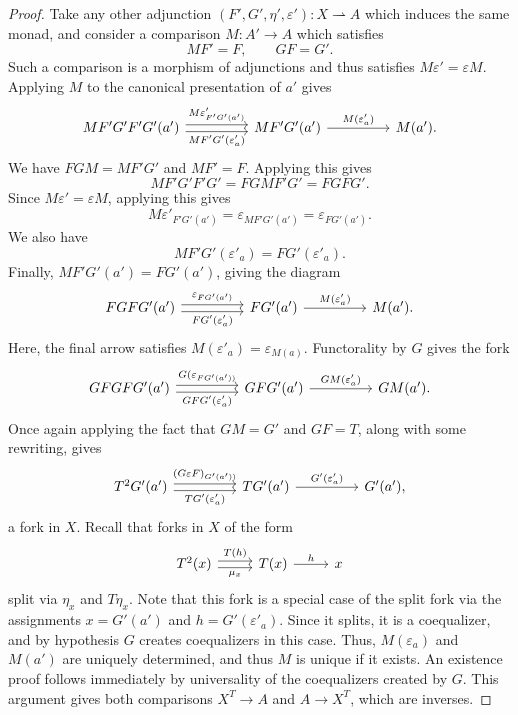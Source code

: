 \begin{proof}
	Take any other adjunction $(F',G',\eta',\varepsilon ') : X\rightharpoonup A$ which induces the same monad, and consider a comparison $M : A' \to A$ which satisfies
	\[
		MF'=F,\qquad GF=G'
	.\]
	Such a comparison is a morphism of adjunctions and thus satisfies $M\varepsilon '=\varepsilon M$. Applying $M$ to the canonical presentation of $a'$ gives
	\[\begin{tikzcd}[row sep = 2.5em, column sep = 4.5em]
	MF'G'F'G'(a') \ar[" M\varepsilon'_{F'G'(a')}  ", shift left, r] \ar[" MF'G'(\varepsilon '_a) "', shift right, r]  & MF'G'(a') \ar[" M(\varepsilon' _a) ", r]  & M(a').
	\end{tikzcd}\]
	We have $FGM=MF'G'$ and $MF'=F$. Applying this gives
	\[
		MF'G'F'G'=FGMF'G'=FGFG'
	.\]
	Since $M\varepsilon '=\varepsilon M$, applying this gives
	\[
		M\varepsilon '_{F'G'(a')} =\varepsilon_{MF'G'(a')} =\varepsilon_{FG'(a')} 
	.\]
	We also have
	\[
		MF'G'(\varepsilon '_{a} )=FG'(\varepsilon '_a)
	.\]
	Finally, $MF'G'(a')=FG'(a')$, giving the diagram
	\[\begin{tikzcd}[row sep = 2.5em, column sep = 4.5em]
	FGFG'(a') \ar[" \varepsilon_{FG'(a')}  ", shift left, r] \ar[" FG'(\varepsilon'_a) "', shift right, r]  & FG'(a') \ar[" M(\varepsilon '_a) ", r]  & M(a').
	\end{tikzcd}\]
	Here, the final arrow satisfies $M(\varepsilon '_a)=\varepsilon_{M(a)} $. Functorality by $G$ gives the fork
	\[\begin{tikzcd}[row sep = 2.5em, column sep = 4.5em]
	GFGFG'(a') \ar[" G(\varepsilon_{FG'(a'))}  ", shift left, r] \ar[" GFG'(\varepsilon'_a) "', shift right, r]  & GFG'(a') \ar[" GM(\varepsilon '_a) ", r]  & GM(a').
	\end{tikzcd}\]
	Once again applying the fact that $GM=G'$ and $GF=T$, along with some rewriting, gives
	\[\begin{tikzcd}[row sep = 2.5em, column sep = 4.5em]
	T^2G'(a') \ar[" (G\varepsilon F)_{G'(a'))}  ", shift left, r] \ar[" TG'(\varepsilon'_a) "', shift right, r]  & TG'(a') \ar[" G'(\varepsilon '_a) ", r]  & G'(a'),
	\end{tikzcd}\]
	a fork in $X$. Recall that forks in $X$ of the form
	\[\begin{tikzcd}[row sep = 2.5em, column sep = 2.5em]
	T^2(x)\ar[" T(h) ", shift left, r] \ar[" \mu_x "', shift right, r]  & T(x)\ar[" h ", r]  & x
	\end{tikzcd}\]
	split via $\eta_x$ and $T\eta_x$. Note that this fork is a special case of the split fork via the assignments $x=G'(a')$ and $h=G'(\varepsilon '_a)$. Since it splits, it is a coequalizer, and by hypothesis $G$ creates coequalizers in this case. Thus, $M(\varepsilon_a)$ and $M(a')$ are uniquely determined, and thus $M$ is unique if it exists. An existence proof follows immediately by universality of the coequalizers created by $G$. This argument gives both comparisons $X^T\to A$ and $A\to X^T$, which are inverses.
\end{proof}

